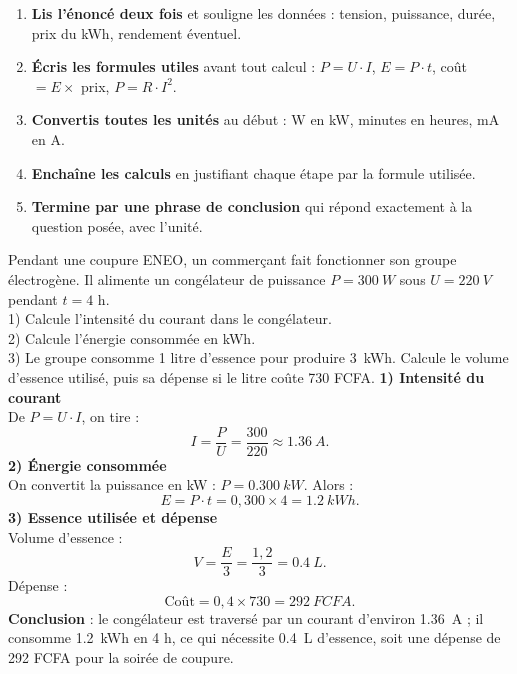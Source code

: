 \documentclass[11pt]{article}
\begin{document}
\begin{methode}
\begin{enumerate}
\item \textbf{Lis l'énoncé deux fois} et souligne les données : tension, puissance, durée, prix du kWh, rendement éventuel.
\item \textbf{Écris les formules utiles} avant tout calcul : $P = U \cdot I$, $E = P \cdot t$, coût $= E \times$ prix, $P = R \cdot I^{2}$.
\item \textbf{Convertis toutes les unités} au début : W en kW, minutes en heures, mA en A.
\item \textbf{Enchaîne les calculs} en justifiant chaque étape par la formule utilisée.
\item \textbf{Termine par une phrase de conclusion} qui répond exactement à la question posée, avec l'unité.
\end{enumerate}
\end{methode}

\begin{exoresolu}
Pendant une coupure ENEO, un commerçant fait fonctionner son groupe électrogène. Il alimente un congélateur de puissance $P = \SI{300}{W}$ sous $U = \SI{220}{V}$ pendant $t = 4$ h.\\
1) Calcule l'intensité du courant dans le congélateur.\\
2) Calcule l'énergie consommée en kWh.\\
3) Le groupe consomme 1 litre d'essence pour produire \SI{3}{kWh}. Calcule le volume d'essence utilisé, puis sa dépense si le litre coûte 730 FCFA.
\tcblower
\textbf{1) Intensité du courant}\\
De $P = U \cdot I$, on tire :
\[ I = \frac{P}{U} = \frac{300}{220} \approx \SI{1,36}{A}. \]
\textbf{2) Énergie consommée}\\
On convertit la puissance en kW : $P = \SI{0,300}{kW}$. Alors :
\[ E = P \cdot t = 0,300 \times 4 = \SI{1,2}{kWh}. \]
\textbf{3) Essence utilisée et dépense}\\
Volume d'essence :
\[ V = \frac{E}{3} = \frac{1,2}{3} = \SI{0,4}{L}. \]
Dépense :
\[ \text{Coût} = 0,4 \times 730 = \SI{292}{FCFA}. \]
\textbf{Conclusion} : le congélateur est traversé par un courant d'environ \SI{1,36}{A} ; il consomme \SI{1,2}{kWh} en 4 h, ce qui nécessite \SI{0,4}{L} d'essence, soit une dépense de 292 FCFA pour la soirée de coupure.
\end{exoresolu}
\end{document}
